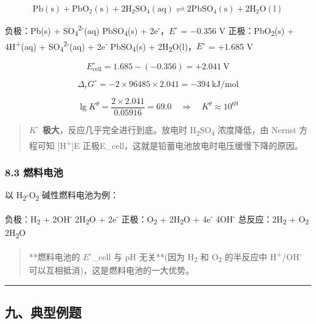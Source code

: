 \[
\mathrm{Pb(s) + PbO_2(s) + 2H_2SO_4(aq) \rightleftharpoons 2PbSO_4(s) + 2H_2O(l)}
\]

负极：Pb(s) + SO\textsubscript{4}\textsuperscript{2-}(aq) \箭 PbSO\textsubscript{4}(s) + 2e\textsuperscript{-}，\(E^{\circ}\) = −0.356 V
正极：PbO\textsubscript{2}(s) + 4H\textsuperscript{+}(aq) + SO\textsubscript{4}\textsuperscript{2-}(aq) + 2e\textsuperscript{-} \箭 PbSO\textsubscript{4}(s) + 2H\textsubscript{2}O(l)，\(E^{\circ}\) = +1.685 V

\[E^\circ_{\text{cell}} = 1.685 - (-0.356) = +2.041\ \mathrm{V}\]

\[\Delta_rG^\circ = -2 \times 96485 \times 2.041 = -394\ \mathrm{kJ/mol}\]

\[\lg K^\theta = \frac{2 \times 2.041}{0.05916} = 69.0 \quad \Rightarrow \quad K^\theta \approx 10^{69}\]

\begin{quote}
\textbf{\(K^{\circ}\) 极大}，反应几乎完全进行到底。放电时 H\textsubscript{2}SO\textsubscript{4} 浓度降低，由 Nernst 方程可知 {[}H\textsuperscript{+}{]} \箭 E 正极 \箭 E\_cell，这就是铅蓄电池放电时电压缓慢下降的原因。
\end{quote}

\subsubsection{8.3 燃料电池}\label{ux71c3ux6599ux7535ux6c60}

以 H\textsubscript{2}-O\textsubscript{2} 碱性燃料电池为例：

负极：H\textsubscript{2} + 2OH\textsuperscript{-} \箭 2H\textsubscript{2}O + 2e\textsuperscript{-}
正极：O\textsubscript{2} + 2H\textsubscript{2}O + 4e\textsuperscript{-} \箭 4OH\textsuperscript{-}
总反应：2H\textsubscript{2} + O\textsubscript{2} \箭 2H\textsubscript{2}O

\begin{quote}
**燃料电池的 \(E^{\circ}\)\_cell 与 pH 无关**(因为 H\textsubscript{2} 和 O\textsubscript{2} 的半反应中 H\textsuperscript{+}/OH\textsuperscript{-} 可以互相抵消)，这是燃料电池的一大优势。
\end{quote}

\begin{center}\rule{0.5\linewidth}{0.5pt}\end{center}

\subsection{九、典型例题}\label{ux4e5dux5178ux578bux4f8bux9898}

